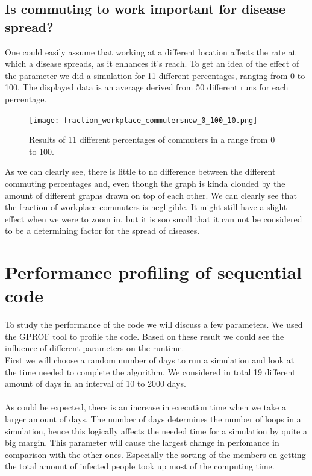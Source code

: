\documentclass[runningheads]{llncs}
\begin{document}
	\subsection{Is commuting to work important for disease spread?}
	One could easily assume that working at a different location affects the rate at which a disease spreads, as it enhances it's reach. To get an idea of the effect of the parameter we did a simulation for 11 different percentages, ranging from 0 to 100. The displayed data is an average derived from 50 different runs for each percentage.
	
	\begin{figure}
		\texttt{[image: fraction\_workplace\_commutersnew\_0\_100\_10.png]}
		\caption{Results of 11 different percentages of commuters in a range from 0 to 100.}
	\end{figure}
	
	\noindent
	As we can clearly see, there is little to no difference between the different commuting percentages and, even though the graph is kinda clouded by the amount of different graphs drawn on top of each other. We can clearly see that the fraction of workplace commuters is negligible. It might still have a slight effect when we were to zoom in, but it is soo small that it can not be considered to be a determining factor for the spread of diseases. 
	\newpage
	\section{Performance profiling of sequential code}
	To study the performance of the code we will discuss a few parameters. We used the GPROF tool to profile the code. Based on these result we could see the influence of different parameters on the runtime.
	\\
	First we will choose a random number of days to run a simulation and look at the time needed to complete the algorithm. We considered in total 19 different amount of days in an interval of 10 to 2000 days. \\ 
	\\
	As could be expected, there is an increase in execution time when we take a larger amount of days. The number of days determines the number of loops in a simulation, hence this logically affects the needed time for a simulation by quite a big margin. This parameter will cause the largest change in perfomance in comparison with the other ones. Especially the sorting of the members en getting the total amount of infected people took up most of the computing time.
	
\end{document}
